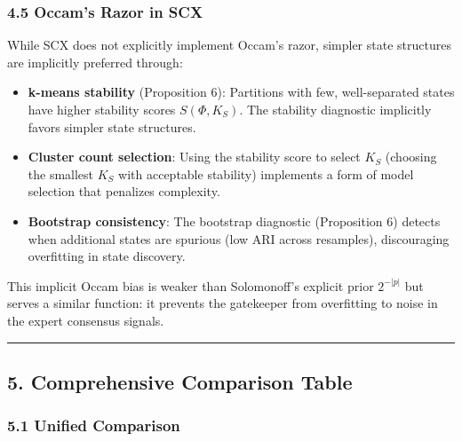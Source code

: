 \documentclass[
  12pt,
]{article}
\begin{document}
\subsubsection{4.5 Occam's Razor in SCX}\label{occams-razor-in-scx}

While SCX does not explicitly implement Occam's razor, simpler state
structures are implicitly preferred through:

\begin{itemize}
\item
  \textbf{k-means stability} (Proposition 6): Partitions with few,
  well-separated states have higher stability scores \(S(\Phi, K_S)\).
  The stability diagnostic implicitly favors simpler state structures.
\item
  \textbf{Cluster count selection}: Using the stability score to select
  \(K_S\) (choosing the smallest \(K_S\) with acceptable stability)
  implements a form of model selection that penalizes complexity.
\item
  \textbf{Bootstrap consistency}: The bootstrap diagnostic (Proposition
  6) detects when additional states are spurious (low ARI across
  resamples), discouraging overfitting in state discovery.
\end{itemize}

This implicit Occam bias is weaker than Solomonoff's explicit prior
\(2^{-|p|}\) but serves a similar function: it prevents the gatekeeper
from overfitting to noise in the expert consensus signals.

\begin{center}\rule{0.5\linewidth}{0.5pt}\end{center}

\subsection{5. Comprehensive Comparison
Table}\label{comprehensive-comparison-table}

\subsubsection{5.1 Unified Comparison}\label{unified-comparison}
\end{document}
